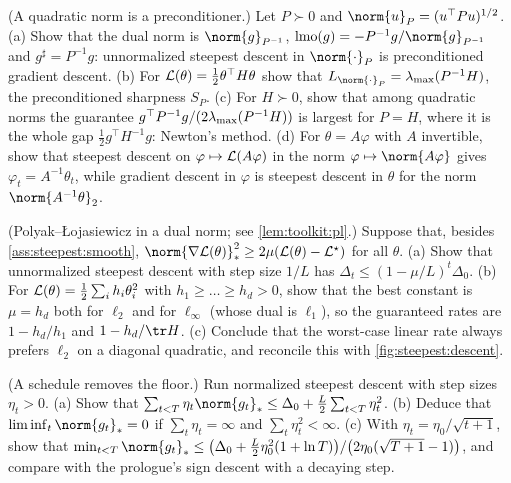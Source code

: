\begin{refsection}
\begin{exercises}
\item \variation (A quadratic norm is a preconditioner.) Let $P\succ0$ and $\norm{u}_P=(u^\top Pu)^{1/2}$. (a) Show that the dual norm is $\norm{g}_{P^{-1}}$, $\lmo(g)=-P^{-1}g/\norm{g}_{P^{-1}}$ and $g^\sharp=P^{-1}g$: unnormalized steepest descent in $\norm{\cdot}_P$ is preconditioned gradient descent. (b) For $\mathcal{L}(\theta)=\frac12\theta^\top H\theta$ show that $L_{\norm{\cdot}_P}=\lmax(P^{-1}H)$, the preconditioned sharpness $S_P$. (c) For $H\succ0$, show that among quadratic norms the guarantee $g^\top P^{-1}g/(2\lambda_{\max}(P^{-1}H))$ is largest for $P=H$, where it is the whole gap $\frac12g^\top H^{-1}g$: Newton's method. (d) For $\theta=A\varphi$ with $A$ invertible, show that steepest descent on $\varphi\mapsto\mathcal{L}(A\varphi)$ in the norm $\varphi\mapsto\norm{A\varphi}$ gives $\varphi_t=A^{-1}\theta_t$, while gradient descent in $\varphi$ is steepest descent in $\theta$ for the norm $\norm{A^{-1}\theta}_2$. \label{ex:steepest:quadnorm}

\item \variation (Polyak--Łojasiewicz in a dual norm; see \cref{lem:toolkit:pl}.) Suppose that, besides \cref{ass:steepest:smooth}, $\norm{\nabla\Loss(\theta)}_*^2\ge2\mu(\Loss(\theta)-\Loss^\star)$ for all $\theta$. (a) Show that unnormalized steepest descent with step size $1/L$ has $\Delta_t\le(1-\mu/L)^t\Delta_0$. (b) For $\mathcal{L}(\theta)=\frac12\sum_ih_i\theta_i^2$ with $h_1\ge\dots\ge h_d>0$, show that the best constant is $\mu=h_d$ both for $\ell_2$ and for $\ell_\infty$ (whose dual is $\ell_1$), so the guaranteed rates are $1-h_d/h_1$ and $1-h_d/\tr H$. (c) Conclude that the worst-case linear rate always prefers $\ell_2$ on a diagonal quadratic, and reconcile this with \cref{fig:steepest:descent}.\label{ex:steepest:pl}

\item \variation (A schedule removes the floor.) Run normalized steepest descent with step sizes $\eta_t>0$. (a) Show that $\sum_{t<T}\eta_t\norm{g_t}_*\le\Delta_0+\frac L2\sum_{t<T}\eta_t^2$. (b) Deduce that $\liminf_t\norm{g_t}_*=0$ if $\sum_t\eta_t=\infty$ and $\sum_t\eta_t^2<\infty$. (c) With $\eta_t=\eta_0/\sqrt{t+1}$, show that $\min_{t<T}\norm{g_t}_*\le\bigl(\Delta_0+\frac L2\eta_0^2(1+\ln T)\bigr)/\bigl(2\eta_0(\sqrt{T+1}-1)\bigr)$, and compare with the prologue's sign descent with a decaying step.\label{ex:steepest:schedule}


\end{exercises}
\end{refsection}

